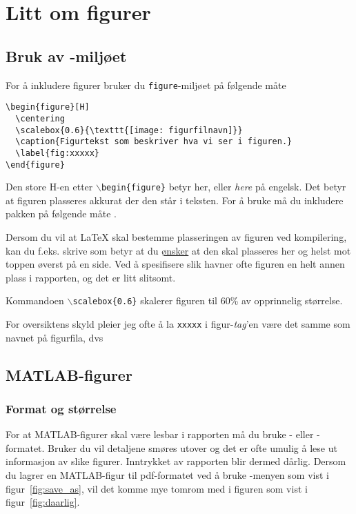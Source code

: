 
\chapter{Litt om figurer}\label{kap:figurer}
 
\section{Bruk av -miljøet}\label{delkap:figure}
For å inkludere figurer bruker du {\tt figure}-miljøet på følgende
måte

\begin{boxedminipage}{\textwidth}
\begin{verbatim}
\begin{figure}[H]
  \centering
  \scalebox{0.6}{\texttt{[image: figurfilnavn]}}
  \caption{Figurtekst som beskriver hva vi ser i figuren.} 
  \label{fig:xxxxx}
\end{figure}
\end{verbatim}
\end{boxedminipage}

Den store H-en etter {\tt $\backslash$begin\{figure\}} betyr her,
eller {\em here} på engelsk. Det betyr at figuren plasseres akkurat
der den står i teksten. For å bruke \fbox{[H]} må du inkludere pakken
 på følgende måte .

Dersom du vil at {\LaTeX} skal bestemme plasseringen av figuren ved
kompilering, kan du f.eks. skrive \fbox{[ht]} som betyr at du
\underline{ønsker} at den skal plasseres her og helst mot toppen
øverst på en side. Ved å spesifisere slik havner ofte figuren en helt
annen plass i rapporten, og det er litt slitsomt.

Kommandoen {\tt $\backslash$scalebox\{0.6\}} skalerer figuren til 60\%
av opprinnelig størrelse. 

For oversiktens skyld pleier jeg ofte å la {\tt xxxxx} i figur-{\em tag}'en
 være det samme som navnet på figurfila, dvs

\section{MATLAB-figurer}
\subsection{Format og størrelse}
For at MATLAB-figurer skal være lesbar i rapporten må du bruke -
eller -formatet. Bruker du  vil detaljene smøres
utover og  det er ofte umulig å lese ut informasjon av slike
figurer. {\color{red}Inntrykket av rapporten blir dermed dårlig. }
Dersom du lagrer en MATLAB-figur til pdf-formatet ved å bruke
-menyen som vist i figur~\ref{fig:save_as}, vil det
komme mye tomrom med i figuren som 
vist i  figur~\ref{fig:daarlig}. 

